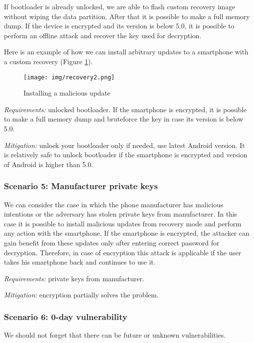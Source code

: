 If bootloader is already unlocked, we are able to flash custom recovery image without wiping the data partition. After that it is possible to make a full memory dump. If the device is encrypted and its version is below 5.0, it is possible to perform an offline attack and recover the key used for decryption.

Here is an example of how we can install arbitrary updates to a smartphone with a custom recovery (Figure \ref{pic:bad_upd}).

\begin{figure}[!ht]
\centering
\texttt{[image: img/recovery2.png]}
\caption{Installing a malicious update}
\label{pic:bad_upd}
\end{figure}


\textsl{Requirements:} unlocked bootloader. If the smartphone is encrypted, it is possible to make a full memory dump and bruteforce the key in case its version is below 5.0.

\textsl{Mitigation:} unlock your bootloader only if needed, use latest Android version. It is relatively safe to unlock bootloader if the smartphone is encrypted and version of Android is higher than 5.0.


\subsubsection{Scenario 5: Manufacturer private keys}

We can consider the case in which the phone manufacturer has malicious intentions or the adversary has stolen private keys from manufacturer. In this case it is possible to install malicious updates from recovery mode and perform any action with the smartphone. If the smartphone is encrypted, the attacker can gain benefit from these updates only after entering correct password for decryption. Therefore, in case of encryption this attack is applicable if the user takes his smartphone back and continues to use it.



\textsl{Requirements:} private keys from manufacturer.

\textsl{Mitigation:} encryption partially solves the problem.


\subsubsection{Scenario 6: 0-day vulnerability}

We should not forget that there can be future or unknown vulnerabilities.


